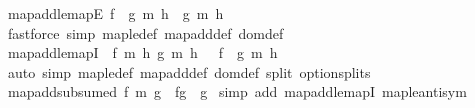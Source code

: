 \begin{isabellebody}
\isamarkupfalse%
\ map{\isacharunderscore}{\kern0pt}add{\isacharunderscore}{\kern0pt}le{\isacharunderscore}{\kern0pt}mapE{\isacharcolon}{\kern0pt}\ {\isachardoublequoteopen}f\ {\isacharplus}{\kern0pt}{\isacharplus}{\kern0pt}\ g\ {\isasymsubseteq}\isactrlsub m\ h\ {\isasymLongrightarrow}\ g\ {\isasymsubseteq}\isactrlsub m\ h{\isachardoublequoteclose}\isanewline
%
\isadelimproof
\ \ %
\endisadelimproof
%
\isatagproof
{}\isamarkupfalse%
\ {\isacharparenleft}{\kern0pt}fastforce\ simp{\isacharcolon}{\kern0pt}\ map{\isacharunderscore}{\kern0pt}le{\isacharunderscore}{\kern0pt}def\ map{\isacharunderscore}{\kern0pt}add{\isacharunderscore}{\kern0pt}def\ dom{\isacharunderscore}{\kern0pt}def{\isacharparenright}{\kern0pt}%
\endisatagproof
{\isafoldproof}%
%
\isadelimproof
\isanewline
%
\endisadelimproof
\isanewline
{}\isamarkupfalse%
\ map{\isacharunderscore}{\kern0pt}add{\isacharunderscore}{\kern0pt}le{\isacharunderscore}{\kern0pt}mapI{\isacharcolon}{\kern0pt}\ {\isachardoublequoteopen}{\isasymlbrakk}\ f\ {\isasymsubseteq}\isactrlsub m\ h{\isacharsemicolon}{\kern0pt}\ g\ {\isasymsubseteq}\isactrlsub m\ h\ {\isasymrbrakk}\ {\isasymLongrightarrow}\ f\ {\isacharplus}{\kern0pt}{\isacharplus}{\kern0pt}\ g\ {\isasymsubseteq}\isactrlsub m\ h{\isachardoublequoteclose}\isanewline
%
\isadelimproof
\ \ %
\endisadelimproof
%
\isatagproof
{}\isamarkupfalse%
\ {\isacharparenleft}{\kern0pt}auto\ simp{\isacharcolon}{\kern0pt}\ map{\isacharunderscore}{\kern0pt}le{\isacharunderscore}{\kern0pt}def\ map{\isacharunderscore}{\kern0pt}add{\isacharunderscore}{\kern0pt}def\ dom{\isacharunderscore}{\kern0pt}def\ split{\isacharcolon}{\kern0pt}\ option{\isachardot}{\kern0pt}splits{\isacharparenright}{\kern0pt}%
\endisatagproof
{\isafoldproof}%
%
\isadelimproof
\isanewline
%
\endisadelimproof
\isanewline
{}\isamarkupfalse%
\ map{\isacharunderscore}{\kern0pt}add{\isacharunderscore}{\kern0pt}subsumed{}{\isacharcolon}{\kern0pt}\ {\isachardoublequoteopen}f\ {\isasymsubseteq}\isactrlsub m\ g\ {\isasymLongrightarrow}\ f{\isacharplus}{\kern0pt}{\isacharplus}{\kern0pt}g\ {\isacharequal}{\kern0pt}\ g{\isachardoublequoteclose}\isanewline
%
\isadelimproof
%
\endisadelimproof
%
\isatagproof
{}\isamarkupfalse%
\ {\isacharparenleft}{\kern0pt}simp\ add{\isacharcolon}{\kern0pt}\ map{\isacharunderscore}{\kern0pt}add{\isacharunderscore}{\kern0pt}le{\isacharunderscore}{\kern0pt}mapI\ map{\isacharunderscore}{\kern0pt}le{\isacharunderscore}{\kern0pt}antisym{\isacharparenright}{\kern0pt}%
\endisatagproof
{\isafoldproof}%

\end{isabellebody}
